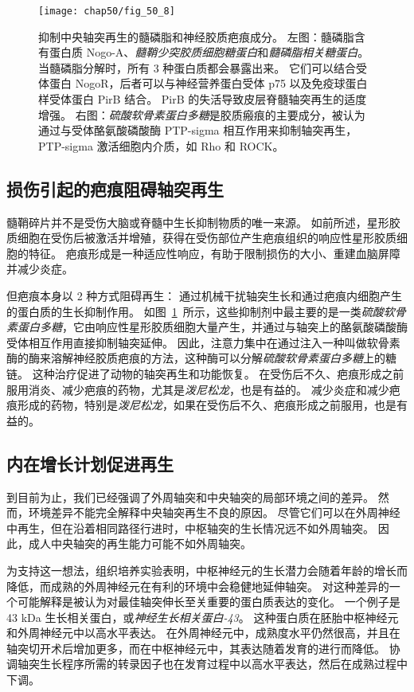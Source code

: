 \begin{figure}[htbp]
	\centering
	\texttt{[image: chap50/fig\_50\_8]}
	\caption{抑制中央轴突再生的髓磷脂和神经胶质疤痕成分\cite{yiu2006glial}。
		左图：髓磷脂含有蛋白质 Nogo-A、\textit{髓鞘少突胶质细胞糖蛋白}和\textit{髓磷脂相关糖蛋白}。
		当髓磷脂分解时，所有 3 种蛋白质都会暴露出来。
		它们可以结合受体蛋白 NogoR，后者可以与神经营养蛋白受体 p75 以及免疫球蛋白样受体蛋白 PirB 结合。
		PirB 的失活导致皮层脊髓轴突再生的适度增强。
		右图：\textit{硫酸软骨素蛋白多糖}是胶质瘢痕的主要成分，被认为通过与受体酪氨酸磷酸酶 PTP-sigma 相互作用来抑制轴突再生，PTP-sigma 激活细胞内介质，如 Rho 和 ROCK。}
	\label{fig:50_8}
\end{figure}



\subsection{损伤引起的疤痕阻碍轴突再生}

髓鞘碎片并不是受伤大脑或脊髓中生长抑制物质的唯一来源。
如前所述，星形胶质细胞在受伤后被激活并增殖，获得在受伤部位产生疤痕组织的响应性星形胶质细胞的特征。
疤痕形成是一种适应性响应，有助于限制损伤的大小、重建血脑屏障并减少炎症。


但疤痕本身以 2 种方式阻碍再生：
通过机械干扰轴突生长和通过疤痕内细胞产生的蛋白质的生长抑制作用。
如图~\ref{fig:50_8}~所示，这些抑制剂中最主要的是一类\textit{硫酸软骨素蛋白多糖}，它由响应性星形胶质细胞大量产生，并通过与轴突上的酪氨酸磷酸酶受体相互作用直接抑制轴突延伸。
因此，注意力集中在通过注入一种叫做软骨素酶的酶来溶解神经胶质疤痕的方法，这种酶可以分解\textit{硫酸软骨素蛋白多糖}上的糖链。
这种治疗促进了动物的轴突再生和功能恢复。
在受伤后不久、疤痕形成之前服用消炎、减少疤痕的药物，尤其是\textit{泼尼松龙}，也是有益的。
减少炎症和减少疤痕形成的药物，特别是\textit{泼尼松龙}，如果在受伤后不久、疤痕形成之前服用，也是有益的。



\subsection{内在增长计划促进再生}

到目前为止，我们已经强调了外周轴突和中央轴突的局部环境之间的差异。
然而，环境差异不能完全解释中央轴突再生不良的原因。
尽管它们可以在外周神经中再生，但在沿着相同路径行进时，中枢轴突的生长情况远不如外周轴突。
因此，成人中央轴突的再生能力可能不如外周轴突。


为支持这一想法，组织培养实验表明，中枢神经元的生长潜力会随着年龄的增长而降低，而成熟的外周神经元在有利的环境中会稳健地延伸轴突。
对这种差异的一个可能解释是被认为对最佳轴突伸长至关重要的蛋白质表达的变化。
一个例子是 43 kDa 生长相关蛋白，或\textit{神经生长相关蛋白-43}。
这种蛋白质在胚胎中枢神经元和外周神经元中以高水平表达。
在外周神经元中，成熟度水平仍然很高，并且在轴突切开术后增加更多，而在中枢神经元中，其表达随着发育的进行而降低。
协调轴突生长程序所需的转录因子也在发育过程中以高水平表达，然后在成熟过程中下调。


